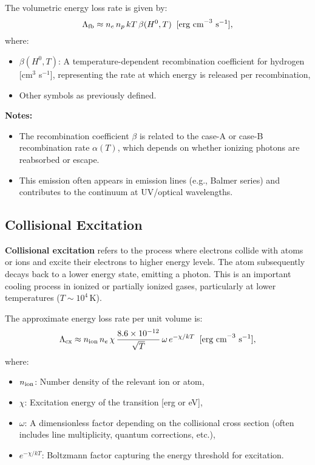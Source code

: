 The volumetric energy loss rate is given by:
\[
\Lambda_{\rm fb} \approx n_e \, n_p \, kT \, \beta(H^0, T) \;\; \text{[erg cm}^{-3}\text{ s}^{-1}\text{]},
\]
where:
\begin{itemize}
    \item \( \beta(H^0, T) \): A temperature-dependent recombination coefficient for hydrogen [cm\(^3\) s\(^{-1}\)], representing the rate at which energy is released per recombination,
    \item Other symbols as previously defined.
\end{itemize}

\textbf{Notes:}
\begin{itemize}
    \item The recombination coefficient \( \beta \) is related to the case-A or case-B recombination rate \( \alpha(T) \), which depends on whether ionizing photons are reabsorbed or escape.
    \item This emission often appears in emission lines (e.g., Balmer series) and contributes to the continuum at UV/optical wavelengths.
\end{itemize}

\subsection{Collisional Excitation}

\textbf{Collisional excitation} refers to the process where electrons collide with atoms or ions and excite their electrons to higher energy levels. The atom subsequently decays back to a lower energy state, emitting a photon. This is an important cooling process in ionized or partially ionized gases, particularly at lower temperatures (\( T \sim 10^4 \, \text{K} \)).

The approximate energy loss rate per unit volume is:
\[
\Lambda_{\rm cx} \approx n_{\rm ion} \, n_e \, \chi \, \frac{8.6 \times 10^{-12}}{\sqrt{T}} \, \omega \, e^{-\chi/kT} \;\; \text{[erg cm}^{-3}\text{ s}^{-1}\text{]},
\]
where:
\begin{itemize}
    \item \( n_{\rm ion} \): Number density of the relevant ion or atom,
    \item \( \chi \): Excitation energy of the transition [erg or eV],
    \item \( \omega \): A dimensionless factor depending on the collisional cross section (often includes line multiplicity, quantum corrections, etc.),
    \item \( e^{-\chi/kT} \): Boltzmann factor capturing the energy threshold for excitation.
\end{itemize}

